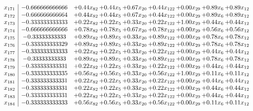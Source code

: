 \documentclass[8pt]{article}
\begin{document}
\[\begin{array}{c| c c@{\hskip 2pt} c@{\hskip 2pt} c@{\hskip 2pt} c@{\hskip 2pt} c@{\hskip 2pt} c@{\hskip 2pt} c@{\hskip 2pt} }
 x_{171}   &  -0.666666666666 & +  0.44 x_{82} & +  0.44 x_{5} & +  0.67 x_{20} & +  0.44 x_{122} & +  0.00 x_{29} & +  0.89 x_{6} & +  0.89 x_{12}\\
 x_{172}   &  -0.666666666664 & +  0.44 x_{82} & +  0.44 x_{5} & +  0.67 x_{20} & +  0.44 x_{122} & +  0.00 x_{29} & +  0.89 x_{6} & +  0.89 x_{12}\\
 x_{173}   &  -0.333333333333 & +  0.22 x_{82} & +  0.22 x_{5} & +  0.33 x_{20} & +  0.22 x_{122} & +  1.00 x_{29} & +  0.44 x_{6} & +  0.44 x_{12}\\
 x_{174}   &  -0.666666666666 & +  0.78 x_{82} & +  0.78 x_{5} & +  0.67 x_{20} & +  0.78 x_{122} & +  0.00 x_{29} & +  0.56 x_{6} & +  0.56 x_{12}\\
 x_{175}   &  -0.33333333333 & +  0.89 x_{82} & +  0.89 x_{5} & +  0.33 x_{20} & +  0.89 x_{122} & +  0.00 x_{29} & +  0.78 x_{6} & +  0.78 x_{12}\\
 x_{176}   &  -0.333333333329 & +  0.89 x_{82} & +  0.89 x_{5} & +  0.33 x_{20} & +  0.89 x_{122} & +  0.00 x_{29} & +  0.78 x_{6} & +  0.78 x_{12}\\
 x_{177}   &  -0.333333333333 & +  0.22 x_{82} & +  0.22 x_{5} & +  0.33 x_{20} & +  0.22 x_{122} & +  0.00 x_{29} & +  0.44 x_{6} & +  0.44 x_{12}\\
 x_{178}   &  -0.33333333333 & +  0.89 x_{82} & +  0.89 x_{5} & +  0.33 x_{20} & +  0.89 x_{122} & +  0.00 x_{29} & +  0.78 x_{6} & +  0.78 x_{12}\\
 x_{179}   &  -0.333333333331 & +  0.22 x_{82} & +  0.22 x_{5} & +  0.33 x_{20} & +  0.22 x_{122} & +  0.00 x_{29} & +  0.44 x_{6} & +  0.44 x_{12}\\
 x_{180}   &  -0.333333333335 & +  0.56 x_{82} & +  0.56 x_{5} & +  0.33 x_{20} & +  0.56 x_{122} & +  1.00 x_{29} & +  0.11 x_{6} & +  0.11 x_{12}\\
 x_{181}   &  -0.333333333331 & +  0.22 x_{82} & +  0.22 x_{5} & +  0.33 x_{20} & +  0.22 x_{122} & +  0.00 x_{29} & +  0.44 x_{6} & +  0.44 x_{12}\\
 x_{182}   &  -0.333333333331 & +  0.22 x_{82} & +  0.22 x_{5} & +  0.33 x_{20} & +  0.22 x_{122} & +  0.00 x_{29} & +  0.44 x_{6} & +  0.44 x_{12}\\
 x_{183}   &  -0.333333333331 & +  0.22 x_{82} & +  0.22 x_{5} & +  0.33 x_{20} & +  0.22 x_{122} & +  0.00 x_{29} & +  0.44 x_{6} & +  0.44 x_{12}\\
 x_{184}   &  -0.333333333333 & +  0.56 x_{82} & +  0.56 x_{5} & +  0.33 x_{20} & +  0.56 x_{122} & +  0.00 x_{29} & +  0.11 x_{6} & +  0.11 x_{12}\\

\end{array}\]
\end{document}
